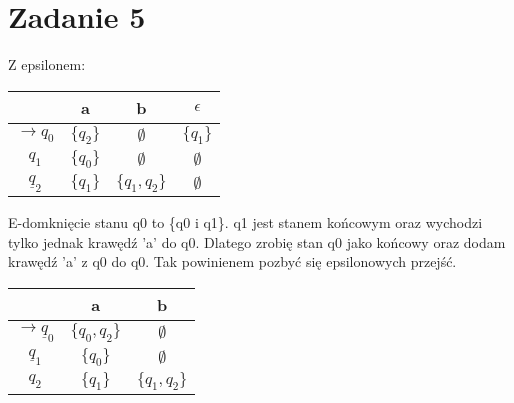 \documentclass{article}
\begin{document}
\section*{Zadanie 5}
Z epsilonem:
\begin{tabular}{ c | c | c | c}
  & a & b & $\epsilon$ \\ 
\hline
$\rightarrow q_0$   & $\{q_2\}$   & $\emptyset$  & $\{q_1\}$\\  \hline
$q_1$               & $\{q_0\}$   & $\emptyset$  & $\emptyset$ \\ \hline
$\underline q_2$    & $\{q_1\}$   & $\{q_1 , q_2\}$ & $\emptyset$\\ 
\end{tabular}
\vspace{1cm}

E-domknięcie stanu q0 to \{q0 i q1\}. q1 jest stanem końcowym oraz wychodzi tylko jednak krawędź 'a' do q0. Dlatego zrobię stan q0 jako końcowy oraz dodam krawędź 'a' z q0 do q0. Tak powinienem pozbyć się epsilonowych przejść.
\vspace{0.5cm}

\begin{tabular}{ c | c | c}
  & a & b \\ 
\hline
$\rightarrow \underline q_0$   & $\{q_0 , q_2\}$   & $\emptyset$\\  \hline
$\underline q_1$                          & $\{q_0\}$         & $\emptyset$ \\ \hline
$q_2$               & $\{q_1\}$         & $\{q_1 , q_2\}$ \\ 
\end{tabular}
\vspace{0.5cm}

\end{document}
